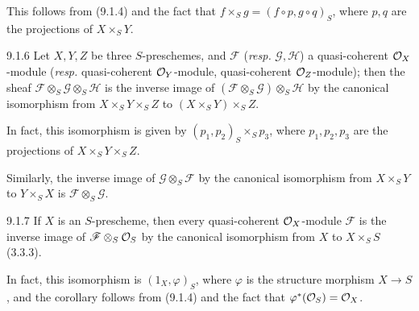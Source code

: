 \documentclass[../main.tex]{subfiles}
\begin{document}
This follows from (9.1.4) and the fact that $f\times_S g=(f\circ p, g\circ q)_S$, where $p,q$ are the projections of $X\times_S Y$.

\begin{cx}[Corollary]{9.1.6}
    Let $X,Y,Z$ be three $S$-preschemes, and $\mathscr{F}$ (\emph{resp.} $\mathscr{G},\mathscr{H}$) a quasi-coherent $\mathcal{O}_X$-module (\emph{resp.} quasi-coherent $\mathcal{O}_Y$-module, quasi-coherent $\mathcal{O}_Z$-module); then the sheaf $\mathscr{F}\otimes_S\mathscr{G}\otimes_S\mathscr{H}$ is the inverse image of $(\mathscr{F}\otimes_S\mathscr{G})\otimes_S\mathscr{H}$ by the canonical isomorphism from $X\times_S Y\times_S Z$ to $(X\times_S Y)\times_S Z$.
\end{cx}

In fact, this isomorphism is given by $(p_1,p_2)_S\times_S p_3$, where $p_1,p_2,p_3$ are the projections of $X\times_S Y\times_S Z$.

Similarly, the inverse image of $\mathscr{G}\otimes_S\mathscr{F}$ by the canonical isomorphism from $X\times_S Y$ to $Y\times_S X$ is $\mathscr{F}\otimes_S\mathscr{G}$.

\begin{cx}[Corollary]{9.1.7}
    If $X$ is an $S$-prescheme, then every quasi-coherent $\mathcal{O}_X$-module $\mathscr{F}$ is the inverse image of $\mathscr{F}\otimes_S\mathcal{O}_S$ by the canonical isomorphism from $X$ to $X\times_S S$ (3.3.3).
\end{cx}

In fact, this isomorphism is $(1_X,\varphi)_S$, where $\varphi$ is the structure morphism $X\to S$, and the corollary follows from (9.1.4) and the fact that $\varphi^*(\mathcal{O}_S)=\mathcal{O}_X$.

\end{document}
